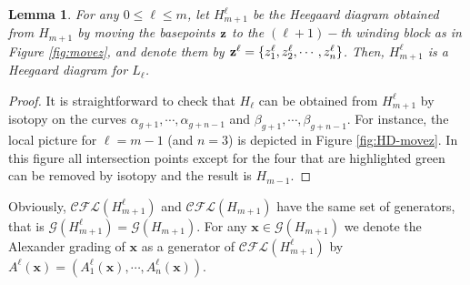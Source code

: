 \documentclass{amsart}
\newtheorem{lemma}[theorem]{Lemma}
\newcommand{\cCFL}{\mathcal{C\!F\!L}}
\newcommand{\alphas}{\boldsymbol{\alpha}}
\newcommand{\betas}{\boldsymbol{\beta}}
\newcommand{\w}{\mathbf{w}}
\newcommand{\x}{\mathbf{x}}
\def\w{{\bf{w}}}
\def\z{{\bf{z}}}
\def\x{\mathbf{x}}
\begin{document}
\begin{lemma}\label{lem:HDmovez}
For any $0\le \ell\le m$, let $H^\ell_{m+1}$ be the Heegaard diagram obtained from $H_{m+1}$ by moving the basepoints $\z$ to the $(\ell+1)-$th winding block as in Figure \ref{fig:movez}, and denote them by $\z^\ell=\{z^\ell_1,z^\ell_2,\cdots,z^\ell_n\}$. Then, $H^\ell_{m+1}$ is a Heegaard diagram for $L_{\ell}$.
\end{lemma}
\begin{proof}
It is straightforward to check that $H_{\ell}$ can be obtained from $H^\ell_{m+1}$ by isotopy on the curves $\alpha_{g+1},\cdots,\alpha_{g+n-1}$ and $\beta_{g+1},\cdots,\beta_{g+n-1}$. For instance, the local picture for $\ell=m-1$ (and $n=3$) is depicted in Figure \ref{fig:HD-movez}. In this figure all intersection points except for the four that are highlighted green can be removed by isotopy and the result is $H_{m-1}$.
\end{proof}

 Obviously, $\cCFL(H_{m+1}^\ell)$ and $\cCFL(H_{m+1})$ have the same set of generators, that is $\mathcal{G}(H_{m+1}^\ell)=\mathcal{G}(H_{m+1})$. For any $\x\in\mathcal{G}(H_{m+1})$ we denote the Alexander grading of $\x$ as a generator of $\cCFL(H_{m+1}^\ell)$ by $A^\ell(\x)=(A_1^\ell(\x),\cdots,A_{n}^\ell(\x))$.






\end{document}
